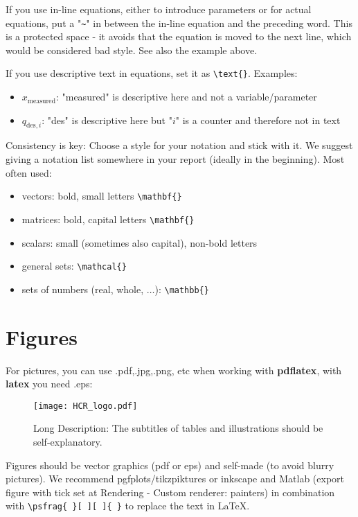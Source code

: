 If you use in-line equations, either to introduce parameters or for actual equations, put a "\verb|~|" in between the in-line equation and the preceding word. This is a protected space - it avoids that the equation is moved to the next line, which would be considered bad style. See also the example above.

If you use descriptive text in equations, set it as \verb|\text{}|. Examples:
\begin{itemize}
	\item $x_{\text{measured}}$: "measured" is descriptive here and not a variable/parameter
	\item $q_{\text{des},i}$: "des" is descriptive here but "$i$" is a counter and therefore not in text
\end{itemize}

Consistency is key: Choose a style for your notation and stick with it. We suggest giving a notation list somewhere in your report (ideally in the beginning).
Most often used:
\begin{itemize}
	\item vectors: bold, small letters \verb|\mathbf{}|
	\item matrices: bold, capital letters \verb|\mathbf{}|
	\item scalars: small (sometimes also capital), non-bold letters
	\item general sets: \verb|\mathcal{}|
	\item sets of numbers (real, whole, $\ldots$): \verb|\mathbb{}|
\end{itemize}

\section{Figures}

For pictures, you can use .pdf,.jpg,.png, etc when working with \textbf{pdflatex}, with \textbf{latex} you need .eps:
\begin{figure}[htb]
\centering
\texttt{[image: HCR\_logo.pdf]}
\caption[Abbreviated Description]{Long Description: The subtitles of tables and illustrations should be self-explanatory.}
\label{fig:abb1}
\end{figure}

Figures should be vector graphics (pdf or eps) and self-made (to avoid blurry pictures). We recommend pgfplots/tikzpiktures or inkscape and Matlab (export figure with tick set at Rendering - Custom renderer: painters) in combination with \verb|\psfrag{ }[ ][ ]{ }| to replace the text in \LaTeX.

